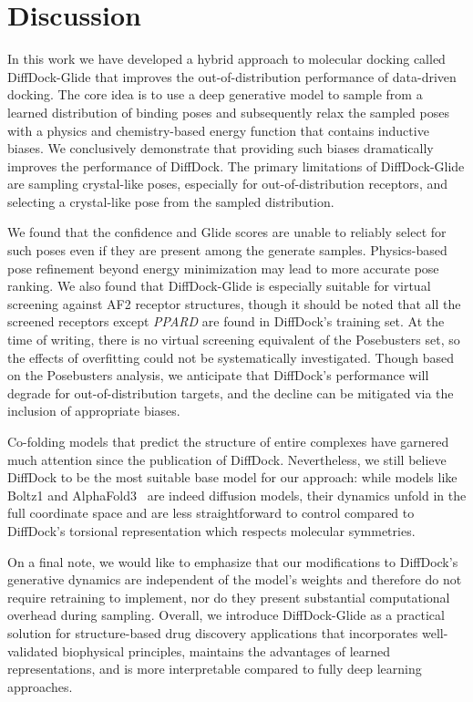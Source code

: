 \section{Discussion}
In this work we have developed a hybrid approach to molecular docking called DiffDock-Glide that improves the out-of-distribution performance of data-driven docking. The core idea is to use a deep generative model to sample from a learned distribution of binding poses and subsequently relax the sampled poses with a physics and chemistry-based energy function that contains inductive biases. We conclusively demonstrate that providing such biases dramatically improves the performance of DiffDock. The primary limitations of DiffDock-Glide are sampling crystal-like poses, especially for out-of-distribution receptors, and selecting a crystal-like pose from the sampled distribution. 

We found that the confidence and Glide scores are unable to reliably select for such poses even if they are present among the generate samples. Physics-based pose refinement beyond energy minimization may lead to more accurate pose ranking. We also found that DiffDock-Glide is especially suitable for virtual screening against AF2 receptor structures, though it should be noted that all the screened receptors except {\it PPARD} are found in DiffDock's training set. At the time of writing, there is no virtual screening equivalent of the Posebusters set, so the effects of overfitting could not be systematically investigated. Though based on the Posebusters analysis, we anticipate that DiffDock's performance will degrade for out-of-distribution targets, and the decline can be mitigated via the inclusion of appropriate biases. 

Co-folding models that predict the structure of entire complexes have garnered much attention since the publication of DiffDock. Nevertheless, we still believe DiffDock to be the most suitable base model for our approach: while models like Boltz1 \cite{wohlwend2024boltz1} and AlphaFold3~\cite{alphafold-3} are indeed diffusion models, their dynamics unfold in the full coordinate space and are less straightforward to control compared to DiffDock's torsional representation which respects molecular symmetries.

On a final note, we would like to emphasize that our modifications to DiffDock's generative dynamics are independent of the model's weights and therefore do not require retraining to implement, nor do they present substantial computational overhead during sampling. Overall, we introduce DiffDock-Glide as a practical solution for structure-based drug discovery applications that incorporates well-validated biophysical principles, maintains the advantages of learned representations, and is more interpretable compared to fully deep learning approaches. 

\clearpage

